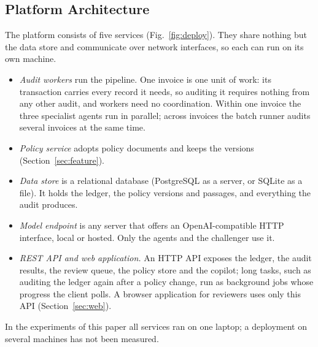 \documentclass[conference]{IEEEtran}
\begin{document}
\subsection{Platform Architecture}
\label{sec:platform}
The platform consists of five services (Fig.~\ref{fig:deploy}). They share nothing but the data store and communicate over network interfaces, so each can run on its own machine.
\begin{itemize}
\item \textit{Audit workers} run the pipeline. One invoice is one unit of work: its transaction carries every record it needs, so auditing it requires nothing from any other audit, and workers need no coordination. Within one invoice the three specialist agents run in parallel; across invoices the batch runner audits several invoices at the same time.
\item \textit{Policy service} adopts policy documents and keeps the versions (Section~\ref{sec:feature}).
\item \textit{Data store} is a relational database (PostgreSQL as a server, or SQLite as a file). It holds the ledger, the policy versions and passages, and everything the audit produces.
\item \textit{Model endpoint} is any server that offers an OpenAI-compatible HTTP interface, local or hosted. Only the agents and the challenger use it.
\item \textit{REST API and web application.} An HTTP API exposes the ledger, the audit results, the review queue, the policy store and the copilot; long tasks, such as auditing the ledger again after a policy change, run as background jobs whose progress the client polls. A browser application for reviewers uses only this API (Section~\ref{sec:web}).
\end{itemize}
In the experiments of this paper all services ran on one laptop; a deployment on several machines has not been measured.
\end{document}

